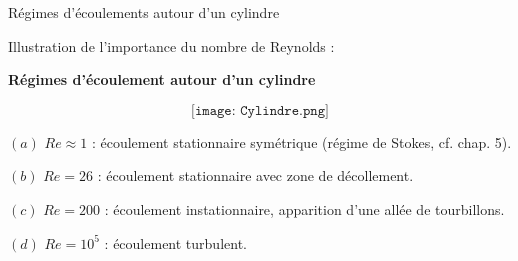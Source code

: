 \begin{frame}{Régimes d'écoulements autour d'un cylindre}

Illustration de l'importance du nombre de Reynolds :

\textbf{Régimes d'écoulement autour d'un cylindre}


\smallskip
$$
\texttt{[image: Cylindre.png]}
$$

$(a)$ \quad $Re\approx 1$ : écoulement stationnaire symétrique (régime de Stokes, cf. chap. 5).

$(b)$ \quad  $Re=26$ : écoulement stationnaire avec zone de décollement.

$(c)$ \quad $Re = 200$ : écoulement instationnaire, apparition d'une allée de tourbillons.

$(d)$ \quad $Re = 10^5$ : écoulement turbulent. 

\end{frame}

